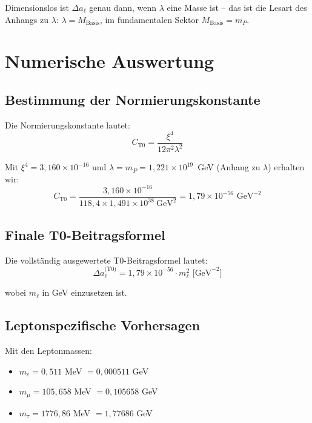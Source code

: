 	Dimensionslos ist $\Delta a_\ell$ genau dann, wenn $\lambda$ eine Masse ist -- das ist die Lesart des Anhangs zu $\lambda$: $\lambda = M_\text{Basis}$, im fundamentalen Sektor $M_\text{Basis} = m_P$.

	\section{Numerische Auswertung}

	\subsection{Bestimmung der Normierungskonstante}

	Die Normierungskonstante lautet:
	\begin{equation}
		C_{\text{T0}} = \frac{\xi^4}{12\pi^2\lambda^2}
		\label{eq:normalization_constant}
	\end{equation}

	Mit $\xi^4 = 3{,}160 \times 10^{-16}$ und $\lambda = m_P = 1{,}221 \times 10^{19}$~GeV (Anhang zu $\lambda$) erhalten wir:
	\begin{equation}
		C_{\text{T0}} = \frac{3{,}160 \times 10^{-16}}{118{,}4 \times 1{,}491 \times 10^{38}\ \text{GeV}^2} = 1{,}79 \times 10^{-56} \text{ GeV}^{-2}
		\label{eq:numerical_constant}
	\end{equation}

	\subsection{Finale T0-Beitragsformel}

	Die vollständig ausgewertete T0-Beitragsformel lautet:
	\begin{equation}
		\boxed{\Delta a_\ell^{\text{(T0)}} = 1{,}79 \times 10^{-56} \cdot m_\ell^2 \text{ [GeV}^{-2}\text{]}}
		\label{eq:final_t0_formula}
	\end{equation}

	wobei $m_\ell$ in GeV einzusetzen ist.

	\subsection{Leptonspezifische Vorhersagen}

	Mit den Leptonmassen:
	\begin{itemize}
		\item $m_e = 0{,}511$ MeV $= 0{,}000511$ GeV
		\item $m_\mu = 105{,}658$ MeV $= 0{,}105658$ GeV
		\item $m_\tau = 1776{,}86$ MeV $= 1{,}77686$ GeV
	\end{itemize}


